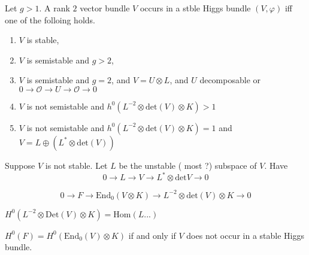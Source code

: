 \begin{proposition}
    Let $ g>1 $. A rank $2$ vector bundle $V$ occurs in a stble Higgs bundle $(V, \varphi) $ iff one of the folloing holds. 
    \begin{enumerate}[label=(\roman*)]
    \item $V$ is stable,
    \item $V$ is semistable and $g>2$, 

    \item $V$ is semistable and $g=2$, and $V = U \otimes L$, 
    and $U$ decomposable or $0 \rightarrow  \mathcal{O} \rightarrow U \rightarrow \mathcal{O} \rightarrow 0 $ 
\item $V$ is not semistable and $h^0 (L^{-2} \otimes \mathrm{det}(V) \otimes K ) > 1 $ 
\item $V$ is not semistable and $h^0 (L^{-2} \otimes \mathrm{det}(V) \otimes K ) = 1 $ and $V = L\oplus (L^* \otimes \mathrm{det}(V) ) $
\end{enumerate}
    
\end{proposition}

Suppose $V$ is not stable. 
Let $ L$ be the unstable ( most ?) subspace of $V$. 
Have 
\begin{equation}
    0 \rightarrow  L \rightarrow  V \rightarrow  L^* \otimes \mathrm{det} V  \rightarrow  0 
\end{equation}

\begin{equation}
    0 \rightarrow  F \rightarrow  \mathrm{End} _0 ( V \otimes K) \rightarrow L^{-2} \otimes \mathrm{det} ( V) \otimes K \rightarrow  0 
\end{equation}

$H^0 ( L^{-2} \otimes \mathrm{Det} (V)  \otimes K ) = \mathrm{Hom} ( L...) $ 


$H^0 ( F) = H^0 ( \mathrm{End}_0 ( V) \otimes K ) $ 
if and only if $ V$ does not occur in a stable Higgs bundle. 














 

